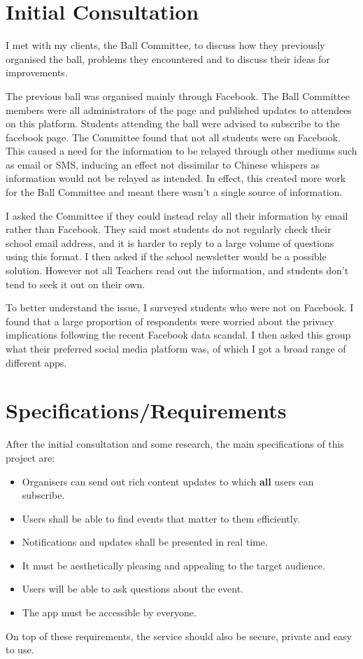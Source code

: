 \documentclass[a4paper,oneside,12pt]{report}
\begin{document}
	\section{Initial Consultation}
	I met with my clients, the Ball Committee, to discuss how they previously organised the ball, problems they encountered and to discuss their ideas for improvements.

    The previous ball was organised mainly through Facebook. The Ball Committee members were all administrators of the page and published updates to attendees on this platform. Students attending the ball were advised to subscribe to the facebook page. The Committee found that not all students were on Facebook. This caused a need for the information to be relayed through other mediums such as email or SMS, inducing an effect not dissimilar to Chinese whispers as information would not be relayed as intended. In effect, this created more work for the Ball Committee and meant there wasn't a single source of information.

    I asked the Committee if they could instead relay all their information by email rather than Facebook. They said most students do not regularly check their school email address, and it is harder to reply to a large volume of questions using this format. I then asked if the school newsletter would be a possible solution. However not all Teachers read out the information, and students don't tend to seek it out on their own.

    To better understand the issue, I surveyed students who were not on Facebook. I found that a large proportion of respondents were worried about the privacy implications following the recent Facebook data scandal. I then asked this group what their preferred social media platform was, of which I got a broad range of different apps.

	\section{Specifications/Requirements}
	After the initial consultation and some research, the main specifications of this project are:
	\begin{itemize}
		\item Organisers can send out rich content updates to which \textbf{all} users can subscribe.
		\item Users shall be able to find events that matter to them efficiently.
		\item Notifications and updates shall be presented in real time.
		\item It must be aesthetically pleasing and appealing to the target audience.
		\item Users will be able to ask questions about the event.
		\item The app must be accessible by everyone.
	\end{itemize}
	On top of these requirements, the service should also be secure, private and easy to use.
\end{document}
